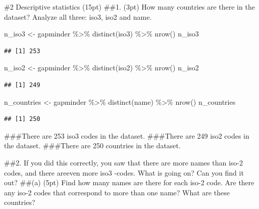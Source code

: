 \documentclass[
]{article}
\newenvironment{Shaded}{\begin{snugshade}}{\end{snugshade}}
\newcommand{\FunctionTok}[1]{\textcolor[rgb]{0.00,0.00,0.00}{#1}}
\newcommand{\NormalTok}[1]{#1}
\newcommand{\OtherTok}[1]{\textcolor[rgb]{0.56,0.35,0.01}{#1}}
\newcommand{\SpecialCharTok}[1]{\textcolor[rgb]{0.00,0.00,0.00}{#1}}
\begin{document}
\#2 Descriptive statistics (15pt) \#\#1. (3pt) How many countries are
there in the dataset? Analyze all three: iso3, iso2 and name.

\begin{Shaded}
\begin{Highlighting}[]
\NormalTok{n\_iso3 }\OtherTok{\textless{}{-}}\NormalTok{ gapminder }\SpecialCharTok{\%\textgreater{}\%} \FunctionTok{distinct}\NormalTok{(iso3) }\SpecialCharTok{\%\textgreater{}\%} \FunctionTok{nrow}\NormalTok{()}
\NormalTok{n\_iso3}
\end{Highlighting}
\end{Shaded}

\begin{verbatim}
## [1] 253
\end{verbatim}

\begin{Shaded}
\begin{Highlighting}[]
\NormalTok{n\_iso2 }\OtherTok{\textless{}{-}}\NormalTok{ gapminder }\SpecialCharTok{\%\textgreater{}\%} \FunctionTok{distinct}\NormalTok{(iso2) }\SpecialCharTok{\%\textgreater{}\%} \FunctionTok{nrow}\NormalTok{()}
\NormalTok{n\_iso2}
\end{Highlighting}
\end{Shaded}

\begin{verbatim}
## [1] 249
\end{verbatim}

\begin{Shaded}
\begin{Highlighting}[]
\NormalTok{n\_countries }\OtherTok{\textless{}{-}}\NormalTok{ gapminder }\SpecialCharTok{\%\textgreater{}\%} \FunctionTok{distinct}\NormalTok{(name) }\SpecialCharTok{\%\textgreater{}\%} \FunctionTok{nrow}\NormalTok{()}
\NormalTok{n\_countries}
\end{Highlighting}
\end{Shaded}

\begin{verbatim}
## [1] 250
\end{verbatim}

\#\#\#There are 253 iso3 codes in the dataset. \#\#\#There are 249 iso2
codes in the dataset. \#\#\#There are 250 countries in the dataset.

\#\#2. If you did this correctly, you saw that there are more names than
iso-2 codes, and there areeven more iso3 -codes. What is going on? Can
you find it out? \#\#(a) (5pt) Find how many names are there for each
iso-2 code. Are there any iso-2 codes that correspond to more than one
name? What are these countries?
\end{document}
